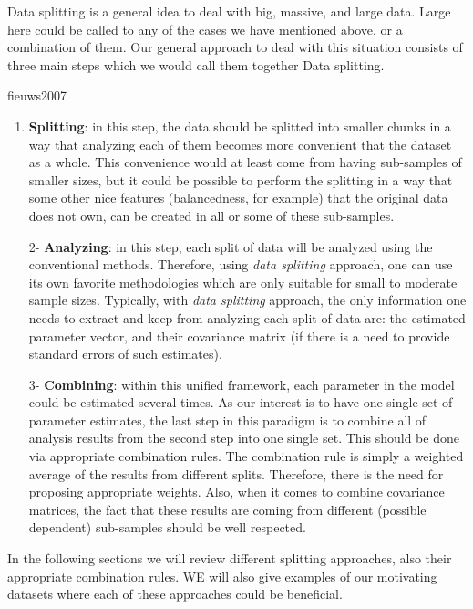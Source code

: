 \documentclass[11pt,a5paper,twoside]{book}
\begin{document}
Data splitting is a general idea to deal with big, massive, and large data. Large here could be called to any of the cases we have mentioned above, or a combination of them. Our general approach to deal with this situation consists of three main steps which we would call them together Data splitting.

fieuws2007\begin{enumerate}
\item \textbf{Splitting}: in this step, the data should be splitted into smaller chunks in a way that analyzing each of them becomes more convenient that the dataset as a whole. This convenience would at least come from having sub-samples of smaller sizes, but it could be possible to perform the splitting in a way that some other nice features (balancedness, for example) that the original data does not own, can be created in all or some of these sub-samples.

2- \textbf{Analyzing}: in this step, each split of data will be analyzed using the conventional methods. Therefore, using \emph{data splitting} approach, one can use its own favorite methodologies which are only suitable for small to moderate sample sizes. Typically, with \emph{data splitting} approach, the only information one needs to extract and keep from analyzing each split of data are: the estimated parameter vector, and their covariance matrix (if there is a need to provide standard errors of such estimates).

3- \textbf{Combining}: within this unified framework, each parameter in the model could be estimated several times. As our interest is to have one single set of parameter estimates, the last step in this paradigm is to combine all of analysis results from the second step into one single set. This should be done via appropriate combination rules. The combination rule is simply a weighted average of the results from different splits. Therefore, there is the need for proposing appropriate weights. Also, when it comes to combine covariance matrices, the fact that these results are coming from different (possible dependent) sub-samples should be well respected. 

\end{enumerate}



In the following sections we will review different splitting approaches, also their appropriate combination rules. WE will also give examples of our motivating datasets where each of these approaches could be beneficial. 
\end{document}
